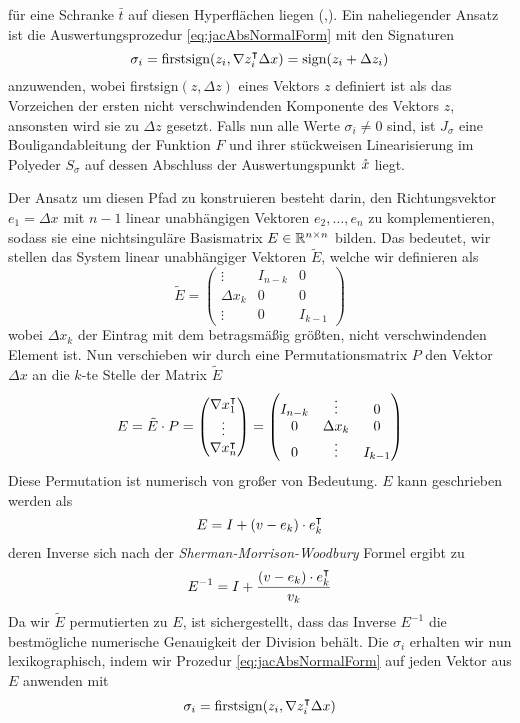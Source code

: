 für eine Schranke $\bar t$ auf diesen Hyperflächen liegen (\cite[Proposition 6]{monster},\cite[S.11]{plan}). 
Ein naheliegender Ansatz ist die Auswertungsprozedur \eqref{eq:jacAbsNormalForm} mit den Signaturen
\[
 \sigma_i = \text{firstsign}(z_i,\nabla z_i^\intercal\Delta x) = \text{sign}(z_i+\Delta z_i)
\]
anzuwenden, wobei firstsign$(z,\Delta z)$ eines Vektors $z$ definiert ist als das Vorzeichen der ersten nicht verschwindenden Komponente des Vektors $z$, ansonsten wird sie zu $\Delta z$ gesetzt. Falls nun alle Werte $\sigma_i \neq 0$ sind, ist $J_\sigma$ eine Bouligandableitung der Funktion $F$ und ihrer stückweisen Linearisierung im Polyeder $S_\sigma$ auf dessen Abschluss der Auswertungspunkt $\mathring{x}$ liegt.

Der Ansatz um diesen Pfad zu konstruieren besteht darin, den Richtungsvektor $e_1 = \Delta x$ mit $n-1$ linear unabhängigen Vektoren $e_2,\ldots, e_n$ zu komplementieren, sodass sie eine nichtsinguläre Basismatrix $E\in \mathbb{R}^{n\times n}$ bilden.
Das bedeutet, wir stellen das System linear unabhängiger Vektoren $\tilde E$, welche wir definieren als
\[
\tilde E = 
 \begin{pmatrix}
  \vdots   & I_{n-k} & 0 \\
  \Delta x_k & 0&0\\
  \vdots   & 0&I_{k-1}
 \end{pmatrix}
\]
wobei $\Delta x_k$ der Eintrag mit dem betragsmäßig größten, nicht verschwindenden Element ist. Nun verschieben wir durch eine Permutationsmatrix $P$ den Vektor $\Delta x$ an die $k$-te Stelle der Matrix $\tilde E$
\[
E = \tilde E \cdot P=
\begin{pmatrix}
  \nabla x_1^\intercal\\
  \vdots\\
  \nabla x_n^\intercal\\
 \end{pmatrix}
 =
  \begin{pmatrix}
   I_{n-k} & \vdots &0\\
  0 & \Delta x_k & 0\\
    0 & \vdots&I_{k-1}
 \end{pmatrix}
\]
Diese Permutation ist numerisch von großer von Bedeutung. $E$ kann geschrieben werden als
\[
  E = I + (v-e_k)\cdot e_k^\intercal 
\] 
deren Inverse sich nach der \textit{Sherman-Morrison-Woodbury} Formel ergibt zu
\[
 E^{-1} = I + \frac{(v-e_k)\cdot e_k^\intercal}{v_k}
\]
Da wir $\tilde E$ permutierten zu $E$, ist sichergestellt, dass das Inverse $E^{-1}$ die bestmögliche numerische Genauigkeit der Division behält.
Die $\sigma_i$ erhalten wir nun lexikographisch, indem wir Prozedur \eqref{eq:jacAbsNormalForm} auf jeden Vektor aus $E$ anwenden mit 
\[
  \sigma_i = \text{firstsign}(z_i,\nabla z_i^\intercal\Delta x)
\]

